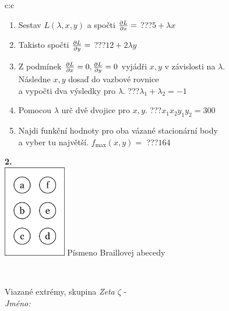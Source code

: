 \documentclass[10pt]{report}
\begin{document}
\begin{tabular}{c:c}
\begin{minipage}[c][104.5mm][t]{0.5\linewidth}
\begin{center}
\begin{minipage}{0.79\linewidth}
\begin{center}
\begin{varwidth}{\linewidth}
\begin{enumerate}
\item Sestav $L(\lambda,x,y)$ a spočti $\pdv{L}{x}=$\quad \dotfill\; ???\;\dotfill \quad $5+\lambda x$
\item Takisto spočti $\pdv{L}{y}=$\quad \dotfill\; ???\;\dotfill \quad $12+2\lambda y$
\item Z podmínek $\pdv{L}{x}=0 , \pdv{L}{y}=0$ vyjádři $x,y$ v závislosti na $\lambda$.\\ \phantom{xxxxxx}Následne $x,y$ dosaď do vazbové rovnice\\ \phantom{xxxxxx}a vypočti dva výsledky pro $\lambda$.\quad \dotfill\; ???\;\dotfill \quad $\lambda_1+\lambda_2=-1$
\item Pomocou $\lambda$ urč dvě dvojice pro $x,y$.\quad \dotfill\; ???\;\dotfill \quad $x_1 x_2 y_1 y_2=300$
\item Najdi funkční hodnoty pro oba vázané stacionární body\\ \phantom{xxxxxx}a vyber tu najvětší. $f_{\text{max}}(x,y)=$\quad \dotfill\; ???\;\dotfill \quad $164$
\end{enumerate}
\end{varwidth}
\end{center}
\end{minipage}
\begin{minipage}{0.20\linewidth}
\begin{center}
{\Huge\bfseries 2.} \\[2mm]
\includegraphics[height=40mm]{../images/braille.png}
{\small Písmeno Braillovej abecedy}
\end{center}
\end{minipage}
\end{center}
\end{minipage}
\\ \hdashline
\begin{minipage}[c][104.5mm][t]{0.5\linewidth}
\begin{center}
\vspace{7mm}
{\huge Viazané extrémy, skupina \textit{Zeta $\zeta$} -}\\[5mm]
\textit{Jméno:}\phantom{xxxxxxxxxxxxxxxxxxxxxxxxxxxxxxxxxxxxxxxxxxxxxxxxxxxxxxxxxxxxxxxxx}\\[5mm]

\end{center}
\end{minipage}
\end{tabular}
\end{document}
